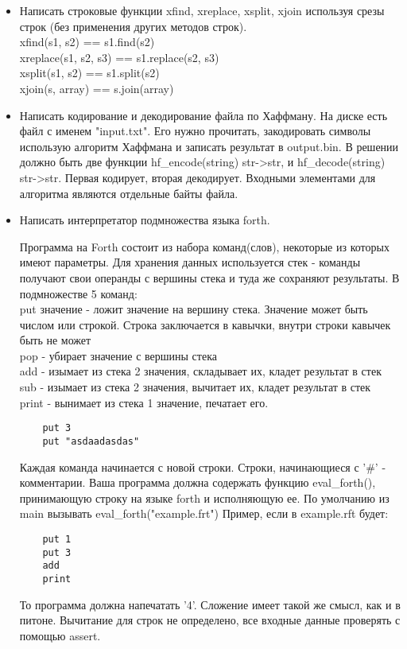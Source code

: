 \documentclass{article}
\begin{document}
\begin{itemize}
	\item Написать строковые функции xfind, xreplace, xsplit, xjoin используя срезы строк 
		    (без применения других методов строк). \\
		  xfind(s1, s2) == s1.find(s2) \\
		  xreplace(s1, s2, s3) == s1.replace(s2, s3) \\
		  xsplit(s1, s2) == s1.split(s2) \\
		  xjoin(s, array) == s.join(array)

	\item Написать кодирование и декодирование файла по Хаффману. 
		  На диске есть файл с именем "input.txt". 
		  Его нужно прочитать, закодировать символы использую алгоритм Хаффмана
		  и записать результат в output.bin. В решении должно быть две функции
		  hf\_encode(string) str->str, и hf\_decode(string) str->str.
		  Первая кодирует, вторая декодирует. Входными элементами для алгоритма
		  являются отдельные байты файла.

	\item Написать интерпретатор подмножества языка forth. 

			Программа на Forth состоит из набора команд(слов),
			некоторые из которых имеют параметры. Для хранения данных используется стек -
			команды получают свои операнды с вершины стека и туда же сохраняют результаты.
			В  подмножестве 5 команд: \\

			put значение - ложит значение на вершину стека.
			Значение может быть числом или строкой. 
			Строка заключается в кавычки, внутри строки кавычек быть не может \\

			pop - убирает значение с вершины стека \\
			add - изымает из стека 2 значения, складывает их, кладет результат в стек\\
			sub - изымает из стека 2 значения, вычитает их, кладет результат в стек \\
			print - вынимает из стека 1 значение, печатает его. \\


\begin{verbatim}
	put 3
	put "asdaadasdas"
\end{verbatim}

			Каждая команда начинается с новой строки. Строки, начинающиеся с '\#' - комментарии.
			Ваша программа должна содержать функцию eval\_forth(), принимающую строку на языке
			forth и исполняющую ее. По умолчанию из main вызывать eval\_forth("example.frt")
			Пример, если в example.rft будет:

\begin{verbatim}
	put 1
	put 3
	add
	print
\end{verbatim}

			То программа должна напечатать '4'. Сложение имеет такой же смысл, как и в питоне. 
			Вычитание для строк не определено, все входные данные проверять с помощью assert.

\end{itemize}
\newpage

\end{document}
